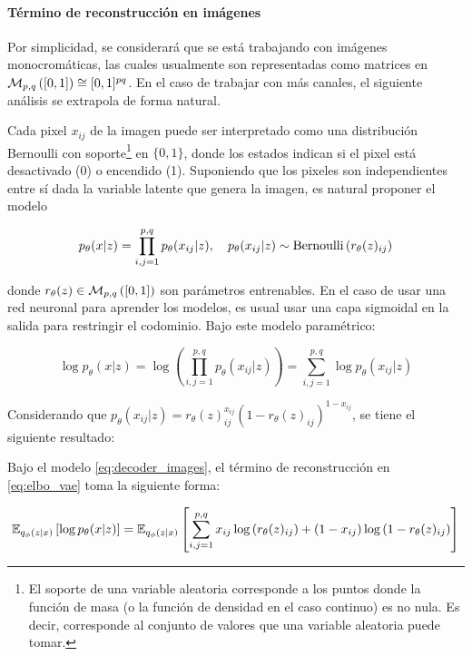 \paragraph{Término de reconstrucción en imágenes}

Por simplicidad, se considerará que se está trabajando con imágenes monocromáticas, las cuales usualmente son representadas como matrices en $\mathcal{M}_{p,q}\left([0,1]\right)\cong [0,1]^{pq}$. En el caso de trabajar con más canales, el siguiente análisis se extrapola de forma natural.

Cada pixel $x_{ij}$ de la imagen puede ser interpretado como una distribución Bernoulli con soporte\footnote{El soporte de una variable aleatoria corresponde a los puntos donde la función de masa (o la función de densidad en el caso continuo) es no nula. Es decir, corresponde al conjunto de valores que una variable aleatoria puede tomar.} en $\{0,1\}$, donde los estados indican si el pixel está desactivado (0) o encendido (1). Suponiendo que los pixeles son independientes entre sí dada la variable latente que genera la imagen, es natural proponer el modelo

\begin{equation}
	p_\theta(x|z)=\prod_{i,j=1}^{p,q} p_\theta(x_{ij}|z), \quad
	p_\theta(x_{ij}|z) \sim \operatorname{Bernoulli}\left(r_\theta(z)_{ij}\right)
	\label{eq:decoder_images}
\end{equation}

donde $r_\theta(z)\in\mathcal{M}_{p,q}\left([0,1]\right)$ son parámetros entrenables. En el caso de usar una red neuronal para aprender los modelos, es usual usar una capa sigmoidal en la salida para restringir el codominio. Bajo este modelo paramétrico:

\begin{equation}
	\log p_\theta(x|z) = \log\left(\prod_{i,j=1}^{p,q} p_\theta(x_{ij}|z)\right) = \sum_{i,j=1}^{p,q} \log p_\theta(x_{ij}|z)
\end{equation}

Considerando que $p_\theta(x_{ij}|z) = r_\theta(z)_{ij}^{x_{ij}}(1-r_\theta(z)_{ij})^{1-x_{ij}}$, se tiene el siguiente resultado:

\begin{prop}
	Bajo el modelo \eqref{eq:decoder_images}, el término de reconstrucción en \eqref{eq:elbo_vae} toma la siguiente forma:

	\begin{equation}
		\mathbb{E}_{q_\phi(z|x)}\left[\log p_\theta(x|z)\right] = \mathbb{E}_{q_\phi(z|x)}\left[\sum_{i,j=1}^{p,q} x_{ij}\log\left(r_\theta(z)_{ij}\right)+(1-x_{ij})\log\left(1-r_\theta(z)_{ij}\right)\right]
	\end{equation}
\end{prop}

